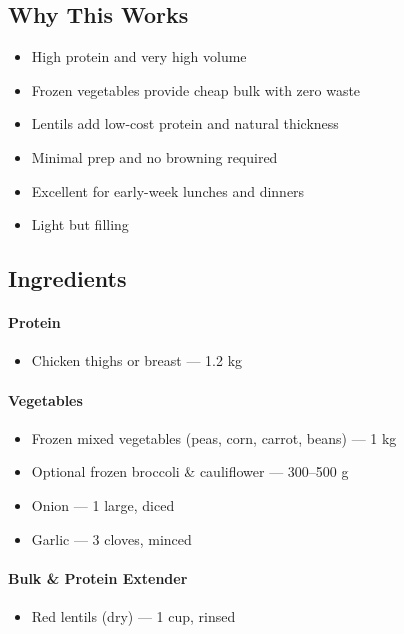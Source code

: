 \documentclass[11pt,a4paper]{article}
\begin{document}
\vspace{0.5em}

\subsection*{Why This Works}
\begin{itemize}
    \item High protein and very high volume
    \item Frozen vegetables provide cheap bulk with zero waste
    \item Lentils add low-cost protein and natural thickness
    \item Minimal prep and no browning required
    \item Excellent for early-week lunches and dinners
    \item Light but filling
\end{itemize}

\vspace{0.5em}

\subsection*{Ingredients}

\paragraph{Protein}
\begin{itemize}
    \item Chicken thighs or breast — 1.2 kg
\end{itemize}

\paragraph{Vegetables}
\begin{itemize}
    \item Frozen mixed vegetables (peas, corn, carrot, beans) — 1 kg
    \item Optional frozen broccoli \& cauliflower — 300--500 g
    \item Onion — 1 large, diced
    \item Garlic — 3 cloves, minced
\end{itemize}

\paragraph{Bulk \& Protein Extender}
\begin{itemize}
    \item Red lentils (dry) — 1 cup, rinsed
\end{itemize}
\end{document}
